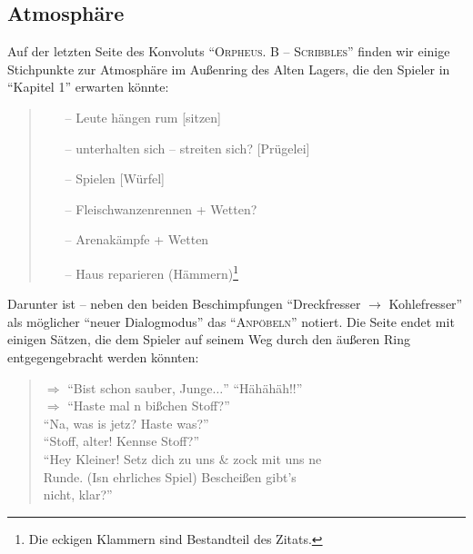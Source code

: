 \documentclass[a5paper,pagesize,numbers=noenddot]{scrbook}
\begin{document}
\subsection{Atmosphäre}\label{sec:orpheus_welt_atmosphaere}
Auf der letzten Seite des Konvoluts \enquote{\textsc{Orpheus. B -- Scribbles}} finden wir einige Stichpunkte zur Atmosphäre im Außenring des Alten Lagers, die den Spieler in \enquote{Kapitel 1} erwarten könnte:

\begin{quote}
   \begin{itemize}
      \item[--] Leute hängen rum [sitzen]
      \item[--] unterhalten sich -- streiten sich? [Prügelei]
      \item[--] Spielen [Würfel]
      \item[--] Fleischwanzenrennen + Wetten?
      \item[--] Arenakämpfe + Wetten
      \item[--] Haus reparieren (Hämmern)\footnote{Die eckigen Klammern sind Bestandteil des Zitats.}
   \end{itemize}
\end{quote}

Darunter ist -- neben den beiden Beschimpfungen \enquote{Dreckfresser $\rightarrow$ Kohlefresser} als möglicher \enquote{neuer Dialogmodus} das \enquote{\textsc{Anpöbeln}} notiert.
Die Seite endet mit einigen Sätzen, die dem Spieler auf seinem Weg durch den äußeren Ring entgegengebracht werden könnten:

\begin{quote}
   $\Rightarrow$ \enquote{Bist schon sauber, Junge$\ldots$} \enquote{Hähähäh!!}\\
   \phantom{$\Rightarrow$} $\Rightarrow$ \enquote{Haste mal n bißchen Stoff?}\\
   \phantom{$\Rightarrow$ $\Rightarrow$} \enquote{Na, was is jetz? Haste was?}\\
   \phantom{$\Rightarrow$ $\Rightarrow$} \enquote{Stoff, alter! Kennse Stoff?}\\
   \phantom{$\Rightarrow$} \enquote{Hey Kleiner! Setz dich zu uns \& zock mit uns ne\\
   \phantom{$\Rightarrow$ \guillemotleft Hey Kleiner} Runde. (Isn ehrliches Spiel) Bescheißen gibt's\\
   \phantom{$\Rightarrow$ \guillemotleft Hey Kleiner Runde. (Isn ehrliches Spiel)} nicht, klar?}
\end{quote}
\end{document}
